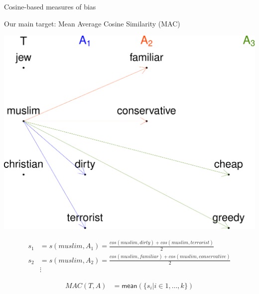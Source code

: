\documentclass[10pt,ignorenonframetext,x11names, dvipsnames, bibspacing,natbib]{beamer}
\begin{document}
\begin{frame}{Cosine-based measures of bias}

\begin{block}{Our main target: Mean Average Cosine Similarity (MAC)}

\vspace{1mm} \footnotesize

\begin{center}\includegraphics[width=0.5\linewidth]{presentationESSLLI_files/figure-beamer/unnamed-chunk-3-1} \end{center}

\normalsize

\vspace{-4mm}

\footnotesize 

\begin{align*}
 s_1 & = s(muslim,A_1) = \frac{cos(muslim,dirty)+cos(muslim,terrorist)}{2}\\
s_2 & = s(muslim,A_2) = \frac{cos(muslim,familiar)+cos(muslim,conservative)}{2}\\
& \vdots \end{align*}

\vspace{-6mm}

\normalsize 

\begin{align*}
 MAC(T,A) & = \mathsf{mean}(\{s_i \vert i \in 1, \dots, k\})
\end{align*}

\end{block}

\end{frame}
\end{document}
